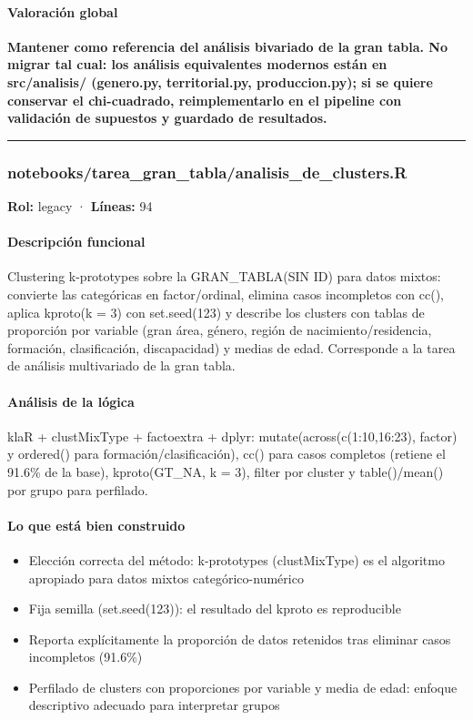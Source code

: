 \paragraph{Valoración global}
\textbf{Mantener como referencia del análisis bivariado de la gran tabla. No migrar tal cual: los análisis equivalentes modernos están en src/analisis/ (genero.py, territorial.py, produccion.py); si se quiere conservar el chi-cuadrado, reimplementarlo en el pipeline con validación de supuestos y guardado de resultados.}

\medskip
\hrule

\subsubsection{notebooks/tarea\_gran\_tabla/analisis\_de\_clusters.R}
\textbf{Rol:} legacy · \textbf{Líneas:} 94

\paragraph{Descripción funcional}
Clustering k-prototypes sobre la GRAN\_TABLA(SIN ID) para datos mixtos: convierte las categóricas en factor/ordinal, elimina casos incompletos con cc(), aplica kproto(k = 3) con set.seed(123) y describe los clusters con tablas de proporción por variable (gran área, género, región de nacimiento/residencia, formación, clasificación, discapacidad) y medias de edad. Corresponde a la tarea de análisis multivariado de la gran tabla.

\paragraph{Análisis de la lógica}
klaR + clustMixType + factoextra + dplyr: mutate(across(c(1:10,16:23), factor) y ordered() para formación/clasificación), cc() para casos completos (retiene el 91.6\% de la base), kproto(GT\_NA, k = 3), filter por cluster y table()/mean() por grupo para perfilado.

\paragraph{Lo que está bien construido}
\begin{itemize}
  \item Elección correcta del método: k-prototypes (clustMixType) es el algoritmo apropiado para datos mixtos categórico-numérico
  \item Fija semilla (set.seed(123)): el resultado del kproto es reproducible
  \item Reporta explícitamente la proporción de datos retenidos tras eliminar casos incompletos (91.6\%)
  \item Perfilado de clusters con proporciones por variable y media de edad: enfoque descriptivo adecuado para interpretar grupos
\end{itemize}

